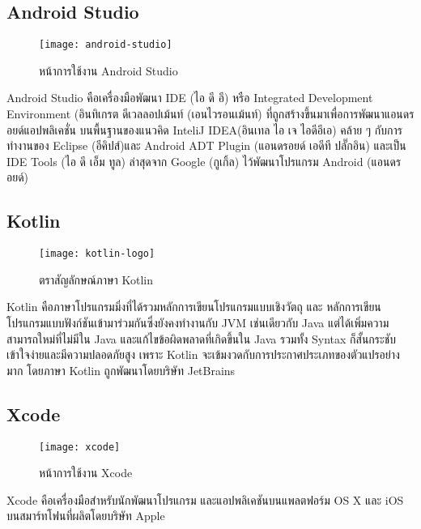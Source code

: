     \subsection{Android Studio}
        \begin{figure}[H]
            \centering
            \texttt{[image: android-studio]}
            \caption{หน้าการใช้งาน Android Studio}\label{android-studio}
        \end{figure}
        Android Studio คือเครื่องมือพัฒนา IDE (ไอ ดี อี) หรือ Integrated Development Environment (อินทิเกรต ดีเวลลอปเม้นท์ (เอนไวรอนเม้นท์) ที่ถูกสร้างขึ้นมาเพื่อการพัฒนาแอนดรอยด์แอปพลิเคชั่น บนพื้นฐานของแนวคิด InteliJ IDEA(อินเทล ไอ เจ ไอดีอีเอ) คล้าย ๆ กับการทำงานของ Eclipse (อีคิปส์)และ Android ADT Plugin (แอนดรอยด์ เอดีที ปลั๊กอิน) และเป็น IDE Tools (ไอ ดี เอ็ม ทูล) ล่าสุดจาก Google (กูเกิ้ล)  ไว้พัฒนาโปรแกรม Android (แอนดรอยด์)\cite{android-studio}

    \subsection{Kotlin}
        \begin{figure}[H]
            \centering
            \texttt{[image: kotlin-logo]}
            \caption{ตราสัญลักษณ์ภาษา Kotlin}\label{kotlin-logo}
        \end{figure}
        Kotlin คือภาษาโปรแกรมมิ่งที่ได้รวมหลักการเขียนโปรแกรมแบบเชิงวัตถุ และ หลักการเขียนโปรแกรมแบบฟังก์ชันเข้ามาร่วมกันซึ่งยังคงทำงานกับ JVM เช่นเดียวกับ Java แต่ได้เพิ่มความสามารถใหม่ที่ไม่มีใน Java และแก้ไขข้อผิดพลาดที่เกิดขึ้นใน Java รวมทั้ง Syntax ก็สั้นกระชับเข้าใจง่ายและมีความปลอดภัยสูง  เพราะ Kotlin จะเข้มงวดกับการประกาศประเภทของตัวแปรอย่างมาก โดยภาษา Kotlin ถูกพัฒนาโดยบริษัท JetBrains

    \subsection{Xcode}
        \begin{figure}[H]
            \centering
            \texttt{[image: xcode]}
            \caption{หน้าการใช้งาน Xcode}\label{xcode}
        \end{figure}
        Xcode คือเครื่องมือสำหรับนักพัฒนาโปรแกรม และแอปพลิเคชันบนแพลตฟอร์ม OS X และ iOS บนสมาร์ทโฟนที่ผลิตโดยบริษัท Apple

